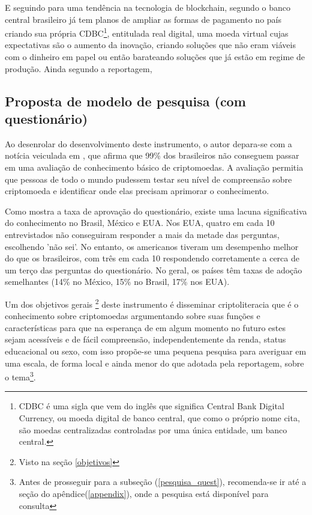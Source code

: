 E seguindo para uma tendência na tecnologia de blockchain, segundo \cite{UOL} o banco central brasileiro já tem planos de ampliar as formas de pagamento no país criando sua própria CDBC\footnote{CDBC é uma sigla que vem do inglês que significa Central Bank Digital Currency, ou moeda digital de banco central, que como o próprio nome cita, são moedas centralizadas controladas por uma única entidade, um banco central.}, entitulada real digital, uma moeda virtual cujas expectativas são o aumento da inovação, criando soluções que não eram viáveis com o dinheiro em papel ou então barateando soluções que já estão em regime de produção. Ainda segundo a reportagem, 

\subsection{Proposta de modelo de pesquisa (com questionário)} 
Ao desenrolar do desenvolvimento deste instrumento, o autor depara-se com a notícia veiculada em \cite{DINO}, que  afirma que 99\% dos brasileiros não conseguem passar em uma avaliação de conhecimento básico de criptomoedas. A avaliação permitia que pessoas de todo o mundo pudessem testar seu nível de compreensão sobre criptomoeda e identificar onde elas precisam aprimorar o conhecimento.

\begin{citacao}
	Como mostra a taxa de aprovação do questionário, existe uma lacuna significativa do conhecimento no Brasil, México e EUA. Nos EUA, quatro em cada 10 entrevistados não conseguiram responder a mais da metade das perguntas, escolhendo 'não sei'. No entanto, os americanos tiveram um desempenho melhor do que os brasileiros, com três em cada 10 respondendo corretamente a cerca de um terço das perguntas do questionário. No geral, os países têm taxas de adoção semelhantes (14\% no México, 15\% no Brasil, 17\% nos EUA). \cite{DINO}
	\end{citacao} 

Um dos objetivos gerais \footnote{Visto na seção \ref{objetivos}} deste instrumento é disseminar criptoliteracia que é o conhecimento sobre criptomoedas argumentando sobre suas funções e características para que na esperança de em algum momento no futuro estes sejam acessíveis e de fácil compreensão, independentemente da renda, status educacional ou sexo, com isso propõe-se uma pequena pesquisa para averiguar em uma escala, de forma local e ainda menor do que adotada pela reportagem,  sobre o tema\footnote{Antes de prosseguir para a subseção (\ref{pesquisa_quest}), recomenda-se ir até a seção do apêndice(\ref{appendix}), onde a pesquisa está disponível para consulta}.  

